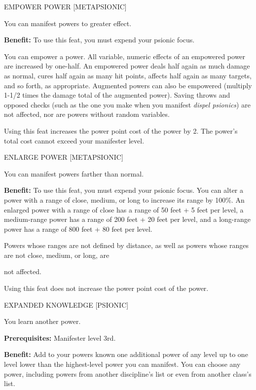 \documentclass{article}
\begin{document}
\vspace{12pt}
EMPOWER POWER [METAPSIONIC]

You can manifest powers to greater effect.

\textbf{Benefit:} To use this feat, you must expend your psionic focus.

You can empower a power. All variable, numeric effects of an empowered power are 
increased by one-half. An empowered power deals half again as much damage as normal, 
cures half again as many hit points, affects half again as many targets, and so 
forth, as appropriate. Augmented powers can also be empowered (multiply 1-1/2 times 
the damage total of the augmented power). Saving throws and opposed checks (such 
as the one you make when you manifest \textit{dispel psionics}) are not affected, 
nor are powers without random variables.

Using this feat increases the power point cost of the power by 2. The power's total 
cost cannot exceed your manifester level.

\vspace{12pt}
ENLARGE POWER [METAPSIONIC]

You can manifest powers farther than normal.

\textbf{Benefit:} To use this feat, you must expend your psionic focus. You can 
alter a power with a range of close, medium, or long to increase its range by 100\%. 
An enlarged power with a range of close has a range of 50 feet + 5 feet per level, 
a medium-range power has a range of 200 feet + 20 feet per level, and a long-range 
power has a range of 800 feet + 80 feet per level.

Powers whose ranges are not defined by distance, as well as powers whose ranges 
are not close, medium, or long, are

not affected.

Using this feat does not increase the power point cost of the power.

\vspace{12pt}
EXPANDED KNOWLEDGE [PSIONIC]

You learn another power.

\textbf{Prerequisites:} Manifester level 3rd.

\textbf{Benefit:} Add to your powers known one additional power of any level up 
to one level lower than the highest-level power you can manifest. You can choose 
any power, including powers from another discipline's list or even from another 
class's list.
\end{document}
